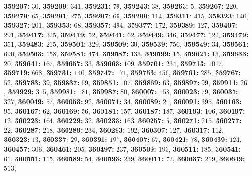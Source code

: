 \textsf{\bfseries 359207:} $30$, \textsf{\bfseries 359209:} $341$, \textsf{\bfseries 359231:} $79$, \textsf{\bfseries 359243:} $38$, \textsf{\bfseries 359263:} $5$, \textsf{\bfseries 359267:} $220$, \textsf{\bfseries 359279:} $65$, \textsf{\bfseries 359291:} $275$, \textsf{\bfseries 359297:} $66$, \textsf{\bfseries 359299:} $114$, \textsf{\bfseries 359311:} $415$, \textsf{\bfseries 359323:} $140$, \textsf{\bfseries 359327:} $201$, \textsf{\bfseries 359353:} $68$, \textsf{\bfseries 359357:} $494$, \textsf{\bfseries 359377:} $172$, \textsf{\bfseries 359389:} $127$, \textsf{\bfseries 359407:} $291$, \textsf{\bfseries 359417:} $325$, \textsf{\bfseries 359419:} $52$, \textsf{\bfseries 359441:} $62$, \textsf{\bfseries 359449:} $346$, \textsf{\bfseries 359477:} $122$, \textsf{\bfseries 359479:} $351$, \textsf{\bfseries 359483:} $215$, \textsf{\bfseries 359501:} $329$, \textsf{\bfseries 359509:} $30$, \textsf{\bfseries 359539:} $756$, \textsf{\bfseries 359549:} $34$, \textsf{\bfseries 359561:} $690$, \textsf{\bfseries 359563:} $158$, \textsf{\bfseries 359581:} $474$, \textsf{\bfseries 359587:} $133$, \textsf{\bfseries 359599:} $15$, \textsf{\bfseries 359621:} $13$, \textsf{\bfseries 359633:} $20$, \textsf{\bfseries 359641:} $167$, \textsf{\bfseries 359657:} $33$, \textsf{\bfseries 359663:} $109$, \textsf{\bfseries 359701:} $234$, \textsf{\bfseries 359713:} $1017$, \textsf{\bfseries 359719:} $668$, \textsf{\bfseries 359731:} $140$, \textsf{\bfseries 359747:} $171$, \textsf{\bfseries 359753:} $456$, \textsf{\bfseries 359761:} $285$, \textsf{\bfseries 359767:} $52$, \textsf{\bfseries 359783:} $39$, \textsf{\bfseries 359837:} $59$, \textsf{\bfseries 359851:} $107$, \textsf{\bfseries 359869:} $63$, \textsf{\bfseries 359897:} $99$, \textsf{\bfseries 359911:} $26$, \textsf{\bfseries 359929:} $315$, \textsf{\bfseries 359981:} $181$, \textsf{\bfseries 359987:} $80$, \textsf{\bfseries 360007:} $158$, \textsf{\bfseries 360023:} $79$, \textsf{\bfseries 360037:} $327$, \textsf{\bfseries 360049:} $57$, \textsf{\bfseries 360053:} $92$, \textsf{\bfseries 360071:} $34$, \textsf{\bfseries 360089:} $21$, \textsf{\bfseries 360091:} $395$, \textsf{\bfseries 360163:} $95$, \textsf{\bfseries 360167:} $62$, \textsf{\bfseries 360169:} $56$, \textsf{\bfseries 360181:} $157$, \textsf{\bfseries 360187:} $187$, \textsf{\bfseries 360193:} $106$, \textsf{\bfseries 360197:} $12$, \textsf{\bfseries 360223:} $164$, \textsf{\bfseries 360229:} $32$, \textsf{\bfseries 360233:} $163$, \textsf{\bfseries 360257:} $5$, \textsf{\bfseries 360271:} $215$, \textsf{\bfseries 360277:} $22$, \textsf{\bfseries 360287:} $218$, \textsf{\bfseries 360289:} $234$, \textsf{\bfseries 360293:} $192$, \textsf{\bfseries 360307:} $127$, \textsf{\bfseries 360317:} $112$, \textsf{\bfseries 360323:} $13$, \textsf{\bfseries 360337:} $29$, \textsf{\bfseries 360391:} $197$, \textsf{\bfseries 360407:} $67$, \textsf{\bfseries 360421:} $78$, \textsf{\bfseries 360439:} $124$, \textsf{\bfseries 360457:} $306$, \textsf{\bfseries 360461:} $205$, \textsf{\bfseries 360497:} $237$, \textsf{\bfseries 360509:} $193$, \textsf{\bfseries 360511:} $185$, \textsf{\bfseries 360541:} $61$, \textsf{\bfseries 360551:} $115$, \textsf{\bfseries 360589:} $54$, \textsf{\bfseries 360593:} $239$, \textsf{\bfseries 360611:} $72$, \textsf{\bfseries 360637:} $219$, \textsf{\bfseries 360649:} $513$, 
